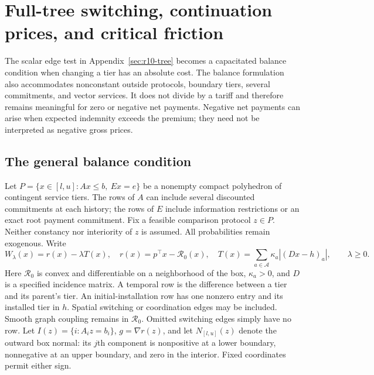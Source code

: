 \section{Full-tree switching, continuation prices, and critical friction}\label{sec:r12-network}
The scalar edge test in Appendix~\ref{sec:r10-tree} becomes a capacitated balance condition when changing a tier has an absolute cost. The balance formulation also accommodates nonconstant outside protocols, boundary tiers, several commitments, and vector services. It does not divide by a tariff and therefore remains meaningful for zero or negative net payments. Negative net payments can arise when expected indemnity exceeds the premium; they need not be interpreted as negative gross prices.

\subsection{The general balance condition}
Let $P=\{x\in[l,u]:Ax\leq b,\ Ex=e\}$ be a nonempty compact polyhedron of contingent service tiers. The rows of $A$ can include several discounted commitments at each history; the rows of $E$ include information restrictions or an exact root payment commitment. Fix a feasible comparison protocol $z\in P$. Neither constancy nor interiority of $z$ is assumed. All probabilities remain exogenous. Write
\begin{equation}\label{eq:r12-problem}
 W_\lambda(x)=r(x)-\lambda T(x),\quad r(x)=p^\top x-\mathcal R_0(x),\quad
 T(x)=\sum_{a\in\mathcal A}\kappa_a |(Dx-h)_a|,
 \qquad\lambda\geq0.
\end{equation}
Here $\mathcal R_0$ is convex and differentiable on a neighborhood of the box, $\kappa_a>0$, and $D$ is a specified incidence matrix. A temporal row is the difference between a tier and its parent's tier. An initial-installation row has one nonzero entry and its installed tier in $h$. Spatial switching or coordination edges may be included. Smooth graph coupling remains in $\mathcal R_0$. Omitted switching edges simply have no row. Let $I(z)=\{i:A_i z=b_i\}$, $g=\nabla r(z)$, and let $N_{[l,u]}(z)$ denote the outward box normal: its $j$th component is nonpositive at a lower boundary, nonnegative at an upper boundary, and zero in the interior. Fixed coordinates permit either sign.

